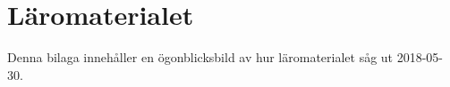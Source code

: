 \chapter{Läromaterialet}
\label{cha:utdrag}

Denna bilaga innehåller en ögonblicksbild av hur läromaterialet såg ut 2018-05-30.


